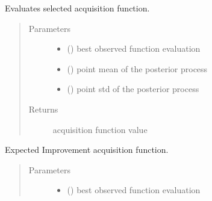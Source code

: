 \documentclass[letterpaper,10pt,english]{sphinxmanual}
\begin{document}
\begin{fulllineitems}
\begin{fulllineitems}
\end{fulllineitems}


\begin{fulllineitems}
\label{\detokenize{index:bo.acquisition.Acquisition.eval}}
Evaluates selected acquisition function.
\begin{quote}\begin{description}
\item[{Parameters}] \leavevmode\begin{itemize}
\item {} 
 () \textendash{} best observed function evaluation

\item {} 
 () \textendash{} point mean of the posterior process

\item {} 
 () \textendash{} point std of the posterior process

\end{itemize}

\item[{Returns}] \leavevmode
acquisition function value

\end{description}\end{quote}

\end{fulllineitems}


\begin{fulllineitems}
\label{\detokenize{index:bo.acquisition.Acquisition.expected_improvement}}
Expected Improvement acquisition function.
\begin{quote}\begin{description}
\item[{Parameters}] \leavevmode\begin{itemize}
\item {} 
 () \textendash{} best observed function evaluation


\end{itemize}
\end{description}
\end{quote}
\end{fulllineitems}
\end{fulllineitems}
\end{document}
